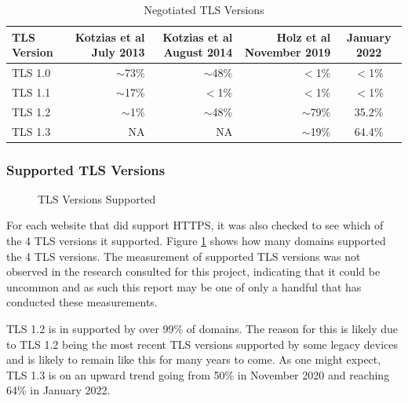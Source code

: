 \documentclass{mscreport}
\begin{document}
\begin{table}[H]
\footnotesize
  \begin{center}
    \begin{tabular}{|l|D|D|D|c|}  %
      \hline
      \textbf{TLS Version} & \textbf{Kotzias et al} \cite{Kotzias2018-wd} July 2013 & \textbf{Kotzias et al} \cite{Kotzias2018-wd} August 2014 & \textbf{Holz et al} \cite{Holz2020-ha} November 2019 & January 2022 \\
      \hline
	  TLS 1.0 & $\sim$73\% & $\sim$48\% & $<$1\% & $<$1\%\\
	  \hline
	  TLS 1.1 & $\sim$17\% & $<$1\% & $<$1\% & $<$1\%\\
	  \hline
	  TLS 1.2 & $\sim$1\% & $\sim$48\% & $\sim$79\% & 35.2\%\\
	  \hline
	  TLS 1.3 & NA & NA & $\sim$19\% & 64.4\%\\
	  \hline
    \end{tabular}
    \caption{Negotiated TLS Versions}
    \label{table:tls_negotiated} %
  \end{center}
\end{table}


\clearpage
\newpage


\subsubsection{Supported TLS Versions}

\begin{figure}[H]
	\begin{center}
		\caption{TLS Versions Supported}
		\label{fig:tls_verions_supported}
	\end{center}
\end{figure}

\noindent
For each website that did support HTTPS, it was also checked to see which of the 4 TLS versions it supported. Figure \ref{fig:tls_verions_supported} shows how many domains supported the 4 TLS versions. The measurement of supported TLS versions was not observed in the research consulted for this project, indicating that it could be uncommon and as such this report may be one of only a handful that has conducted these measurements.

\vspace{0.3cm} \noindent
TLS 1.2 is in supported by over 99\% of domains. The reason for this is likely due to TLS 1.2 being the most recent TLS versions supported by some legacy devices and is likely to remain like this for many years to come. As one might expect, TLS 1.3 is on an upward trend going from 50\% in November 2020 and reaching 64\% in January 2022.
\end{document}
